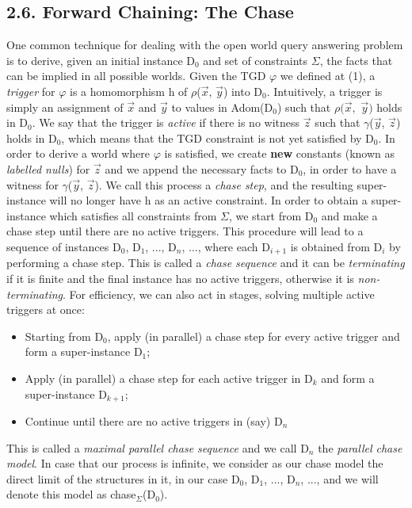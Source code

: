 \documentclass[11pt, a4paper, dvipsnames]{article}
\begin{document}
\subsection{2.6. Forward Chaining: The Chase}
One common technique for dealing with the open world query answering problem is to derive, given an initial instance D$_{0}$ and set of constraints $\Sigma$, the facts that can be implied in all possible worlds.\newline
Given the TGD $\varphi$ we defined at (1), a \textit{trigger} for $\varphi$ is a  homomorphism h of $\rho$($\vec{x}$, $\vec{y}$) into D$_{0}$. Intuitively, a trigger is simply an assignment of $\vec{x}$ and $\vec{y}$ to values in Adom(D$_{0}$) such that $\rho(\vec{x},$ $\vec{y})$ holds in D$_{0}$. We say that the trigger is \textit{active} if there is no witness $\vec{z}$ such that $\gamma$($\vec{y}$, $\vec{z}$) holds in D$_{0}$, which means that the TGD constraint is not yet satisfied by D$_{0}$.\newline
In order to derive a world where $\varphi$ is satisfied, we create \textbf{new} constants (known as \textit{labelled nulls}) for $\vec{z}$ and we append the necessary facts to D$_{0}$, in order to have a witness for $\gamma$($\vec{y}$, $\vec{z}$). We call this process a \textit{chase step}, and the resulting super-instance will no longer have h as an active constraint. In order to obtain a super-instance which satisfies all constraints from $\Sigma$, we start from D$_{0}$ and make a chase step until there are no active triggers. This procedure will lead to a sequence of instances D$_{0}$, D$_{1}$, ..., D$_{n}$, ..., where each D$_{i+1}$ is obtained from D$_{i}$ by performing a chase step. This is called a \textit{chase sequence} and it can be \textit{terminating} if it is finite and the final instance has no active triggers, otherwise it is \textit{non-terminating}.\newline
For efficiency, we can also act in stages, solving multiple active triggers at once:
\begin{itemize}
	\item Starting from D$_{0}$, apply (in parallel) a chase step for every active trigger and form a super-instance D$_{1}$;
	\item Apply (in parallel) a chase step for each active trigger in D$_{k}$ and form a super-instance D$_{k+1}$;
	\item Continue until there are no active triggers in (say) D$_{n}$
\end{itemize}
This is called a \textit{maximal parallel chase sequence} and we call D$_{n}$ the \textit{parallel chase model}. In case that our process is infinite, we consider as our chase model the direct limit of the structures in it, in our case D$_{0}$, D$_{1}$, ..., D$_{n}$, ..., and we will denote this model as chase$_{\Sigma}$(D$_{0}$).\newline
\end{document}
